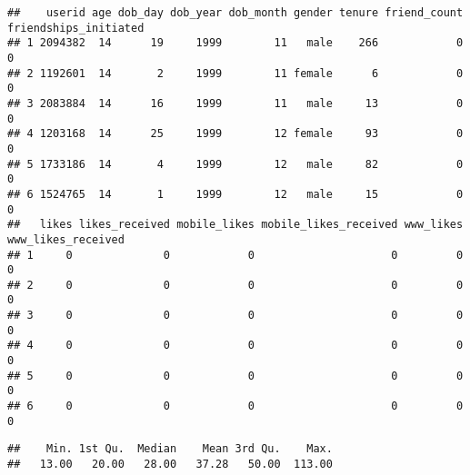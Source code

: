 \documentclass{article}
\begin{document}
\begin{knitrout}
\color{fgcolor}\begin{kframe}
\begin{alltt}
\end{alltt}
\begin{verbatim}
##    userid age dob_day dob_year dob_month gender tenure friend_count friendships_initiated
## 1 2094382  14      19     1999        11   male    266            0                     0
## 2 1192601  14       2     1999        11 female      6            0                     0
## 3 2083884  14      16     1999        11   male     13            0                     0
## 4 1203168  14      25     1999        12 female     93            0                     0
## 5 1733186  14       4     1999        12   male     82            0                     0
## 6 1524765  14       1     1999        12   male     15            0                     0
##   likes likes_received mobile_likes mobile_likes_received www_likes www_likes_received
## 1     0              0            0                     0         0                  0
## 2     0              0            0                     0         0                  0
## 3     0              0            0                     0         0                  0
## 4     0              0            0                     0         0                  0
## 5     0              0            0                     0         0                  0
## 6     0              0            0                     0         0                  0
\end{verbatim}
\begin{alltt}
\hlopt{$}
\end{alltt}
\begin{verbatim}
##    Min. 1st Qu.  Median    Mean 3rd Qu.    Max. 
##   13.00   20.00   28.00   37.28   50.00  113.00
\end{verbatim}
\begin{alltt}
 \hlkwb{<-} \hlstd{(}\hlstd{(}  \hlopt{+}
        \hlstd{(}\hlstd{=}\hlstd{)} \hlopt{+}
        \hlstd{(}\hlstd{=}\hlstd{(}\hlstd{,}\hlstd{,} \hlstd{))}
\hlstd{(}\hlstd{)}
\end{alltt}


{\ttfamily\noindent\itshape\color{messagecolor}{\#\# Saving 7 x 7 in image}}\end{kframe}
\end{knitrout}
\end{document}
